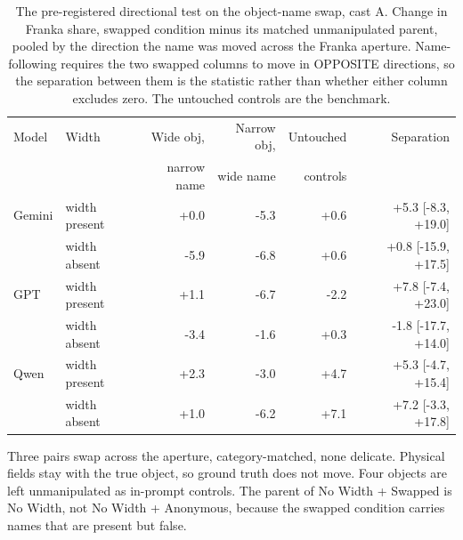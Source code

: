 \begin{table}[H]
  \centering
  \caption{The pre-registered directional test on the object-name swap, cast A. Change in Franka share, swapped condition minus its matched unmanipulated parent, pooled by the direction the name was moved across the Franka aperture. Name-following requires the two swapped columns to move in OPPOSITE directions, so the separation between them is the statistic rather than whether either column excludes zero. The untouched controls are the benchmark.}
  \label{tab:ex1:swap}
  \footnotesize
  \setlength{\tabcolsep}{5pt}
  \begin{tabular}{llrrrr}
    \toprule
    Model & Width & {Wide obj,} & {Narrow obj,} & {Untouched} & {Separation} \\
          &       & {narrow name} & {wide name} & {controls} & \\
    \midrule
    Gemini & width present & +0.0 & -5.3 & +0.6 & +5.3 [-8.3, +19.0] \\
     & width absent & -5.9 & -6.8 & +0.6 & +0.8 [-15.9, +17.5] \\
    GPT & width present & +1.1 & -6.7 & -2.2 & +7.8 [-7.4, +23.0] \\
     & width absent & -3.4 & -1.6 & +0.3 & -1.8 [-17.7, +14.0] \\
    Qwen & width present & +2.3 & -3.0 & +4.7 & +5.3 [-4.7, +15.4] \\
     & width absent & +1.0 & -6.2 & +7.1 & +7.2 [-3.3, +17.8] \\
    \bottomrule
  \end{tabular}
  \begin{minipage}{0.84\linewidth}\vspace{2pt}\footnotesize Three pairs swap across the aperture, category-matched, none delicate. Physical fields stay with the true object, so ground truth does not move. Four objects are left unmanipulated as in-prompt controls. The parent of No Width + Swapped is No Width, not No Width + Anonymous, because the swapped condition carries names that are present but false.\end{minipage}
\end{table}
